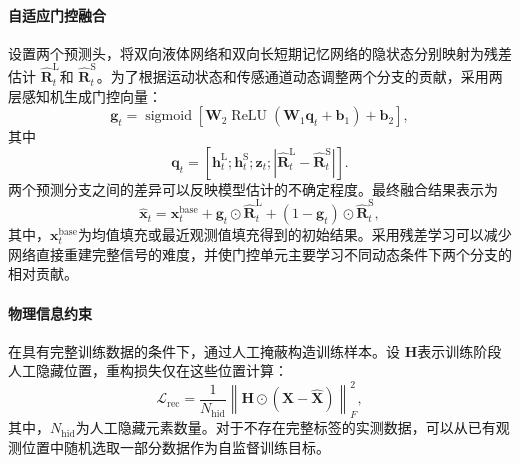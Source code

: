 \paragraph{自适应门控融合}

设置两个预测头，将双向液体网络和双向长短期记忆网络的隐状态分别映射为残差估计
$\widehat{\boldsymbol{R}}_{t}^{\mathrm{L}}$和
$\widehat{\boldsymbol{R}}_{t}^{\mathrm{S}}$。为了根据运动状态和传感通道动态调整两个分支的贡献，采用两层感知机生成门控向量：
\begin{equation}
    \boldsymbol{g}_{t}
    =
    \operatorname{sigmoid}
    \left[
    \boldsymbol{W}_2
    \operatorname{ReLU}
    \left(
    \boldsymbol{W}_1\boldsymbol{q}_{t}
    +\boldsymbol{b}_1
    \right)
    +\boldsymbol{b}_2
    \right],
\end{equation}
其中
\begin{equation}
    \boldsymbol{q}_{t}
    =
    \left[
    \boldsymbol{h}_{t}^{\mathrm{L}};
    \boldsymbol{h}_{t}^{\mathrm{S}};
    \boldsymbol{z}_{t};
    \left|
    \widehat{\boldsymbol{R}}_{t}^{\mathrm{L}}
    -
    \widehat{\boldsymbol{R}}_{t}^{\mathrm{S}}
    \right|
    \right].
\end{equation}
两个预测分支之间的差异可以反映模型估计的不确定程度。最终融合结果表示为
\begin{equation}
    \widehat{\boldsymbol{x}}_{t}
    =
    \boldsymbol{x}_{t}^{\mathrm{base}}
    +
    \boldsymbol{g}_{t}
    \odot\widehat{\boldsymbol{R}}_{t}^{\mathrm{L}}
    +
    (1-\boldsymbol{g}_{t})
    \odot\widehat{\boldsymbol{R}}_{t}^{\mathrm{S}},
\end{equation}
其中，$\boldsymbol{x}_{t}^{\mathrm{base}}$为均值填充或最近观测值填充得到的初始结果。采用残差学习可以减少网络直接重建完整信号的难度，并使门控单元主要学习不同动态条件下两个分支的相对贡献。

\paragraph{物理信息约束}

在具有完整训练数据的条件下，通过人工掩蔽构造训练样本。设
$\boldsymbol{H}$表示训练阶段人工隐藏位置，重构损失仅在这些位置计算：
\begin{equation}
    \mathcal{L}_{\mathrm{rec}}
    =
    \frac{1}{N_{\mathrm{hid}}}
    \left\|
    \boldsymbol{H}
    \odot
    \left(
    \boldsymbol{X}
    -
    \widehat{\boldsymbol{X}}
    \right)
    \right\|_F^2,
\end{equation}
其中，$N_{\mathrm{hid}}$为人工隐藏元素数量。对于不存在完整标签的实测数据，可以从已有观测位置中随机选取一部分数据作为自监督训练目标。

